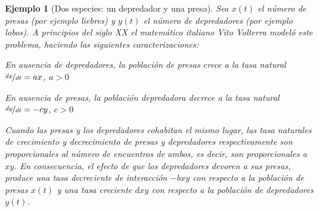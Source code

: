 \documentclass[a5paper,doc,10pt,noapacite]{apa6}
\newtheorem{ejem}{Ejemplo}
\begin{document}
{{\begin{ejem}[Dos especies: un depredador y una presa]
	Sea \(x(t)\) el número de presas (por ejemplo liebres) y \(y(t)\) el número de depredadores (por ejemplo lobos). A principios del siglo XX el matemático italiano Vito Volterra modeló este problema, haciendo las siguientes caracterizaciones:
	\begin{APAitemize}
		\item En ausencia de depredadores, la población de presas crece a la tasa natural \(\nicefrac{dx}{dt}=ax\), \(a>0\)
		\item En ausencia de presas, la población depredadora decrece a la tasa natural \(\nicefrac{dy}{dt}=-cy\), \(c>0\)
		\item Cuando las presas y los depredadores cohabitan el mismo lugar, las tasa naturales de crecimiento y   decrecimiento de presas y depredadores respectivamente son proporcionales al número de encuentros de ambos, es decir, son proporcionales a \(xy\). En consecuencia, el efecto de que los depredadores devoren a sus presas, produce una tasa decreciente de interacción \(-bxy\) con respecto a la población de presas \(x(t)\) y una tasa creciente \(dxy\) con respecto a la población de depredadores \(y(t)\).
		

\end{APAitemize}
\end{ejem}}}
\end{document}
